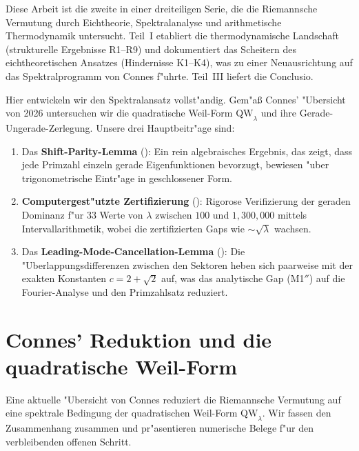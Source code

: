 \documentclass[12pt,a4paper]{article}
\theoremstyle{definition}
\theoremstyle{remark}
\begin{document}
Diese Arbeit ist die zweite in einer dreiteiligen Serie, die die Riemannsche Vermutung durch Eichtheorie, Spektralanalyse und arithmetische Thermodynamik untersucht. Teil~I \cite{Geiger2026partI} etabliert die thermodynamische Landschaft (strukturelle Ergebnisse R1--R9) und dokumentiert das Scheitern des eichtheoretischen Ansatzes (Hindernisse K1--K4), was zu einer Neuausrichtung auf das Spektralprogramm von Connes f"uhrte. Teil~III \cite{Geiger2026partIII} liefert die Conclusio.

Hier entwickeln wir den Spektralansatz vollst"andig. Gem"a\ss{} Connes' "Ubersicht von 2026 \cite{Connes2025} untersuchen wir die quadratische Weil-Form $\mathrm{QW}_\lambda$ und ihre Gerade-Ungerade-Zerlegung. Unsere drei Hauptbeitr"age sind:
\begin{enumerate}
  \item Das \textbf{Shift-Parity-Lemma} (): Ein rein algebraisches Ergebnis, das zeigt, dass jede Primzahl einzeln gerade Eigenfunktionen bevorzugt, bewiesen "uber trigonometrische Eintr"age in geschlossener Form.
  \item \textbf{Computergest"utzte Zertifizierung} (): Rigorose Verifizierung der geraden Dominanz f"ur $33$ Werte von $\lambda$ zwischen $100$ und $1{,}300{,}000$ mittels Intervallarithmetik, wobei die zertifizierten Gaps wie $\sim\!\sqrt{\lambda}$ wachsen.
  \item Das \textbf{Leading-Mode-Cancellation-Lemma} (): Die "Uberlappungsdifferenzen zwischen den Sektoren heben sich paarweise mit der exakten Konstanten $c = 2 + \sqrt{2}$ auf, was das analytische Gap (M1$''$) auf die Fourier-Analyse und den Primzahlsatz reduziert.
\end{enumerate}


\section{Connes' Reduktion und die quadratische Weil-Form}
\label{sec:connes}

Eine aktuelle "Ubersicht von Connes \cite{Connes2025} reduziert die Riemannsche Vermutung auf eine spektrale Bedingung der quadratischen Weil-Form $\mathrm{QW}_\lambda$. Wir fassen den Zusammenhang zusammen und pr"asentieren numerische Belege f"ur den verbleibenden offenen Schritt.
\end{document}
